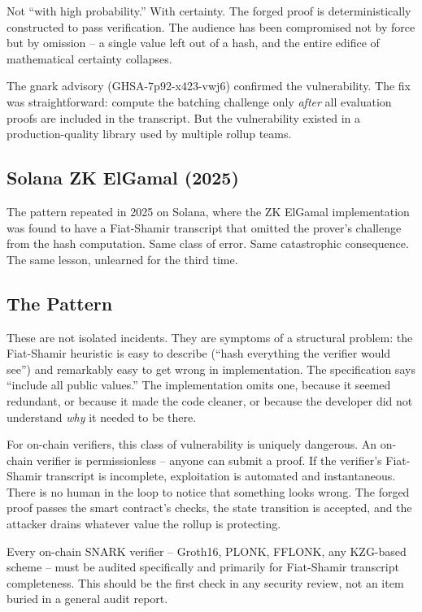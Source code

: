 \documentclass[
  11pt,
  openany]{report}
\begin{document}
Not ``with high probability.'' With certainty. The forged proof is
deterministically constructed to pass verification. The audience has been
compromised not by force but by omission -- a single value left out of a hash,
and the entire edifice of mathematical certainty collapses.

The gnark advisory (GHSA-7p92-x423-vwj6) confirmed the vulnerability. The fix
was straightforward: compute the batching challenge only \emph{after} all
evaluation proofs are included in the transcript. But the vulnerability existed
in a production-quality library used by multiple rollup teams.

\subsection{Solana ZK ElGamal (2025)}\label{solana-zk-elgamal-2025}

The pattern repeated in 2025 on Solana, where the ZK ElGamal implementation was
found to have a Fiat-Shamir transcript that omitted the prover's challenge from
the hash computation. Same class of error. Same catastrophic consequence. The
same lesson, unlearned for the third time.

\subsection{The Pattern}\label{the-pattern}

These are not isolated incidents. They are symptoms of a structural problem: the
Fiat-Shamir heuristic is easy to describe (``hash everything the verifier would
see'') and remarkably easy to get wrong in implementation. The specification
says ``include all public values.'' The implementation omits one, because it
seemed redundant, or because it made the code cleaner, or because the developer
did not understand \emph{why} it needed to be there.

For on-chain verifiers, this class of vulnerability is uniquely dangerous. An
on-chain verifier is permissionless -- anyone can submit a proof. If the
verifier's Fiat-Shamir transcript is incomplete, exploitation is automated and
instantaneous. There is no human in the loop to notice that something looks
wrong. The forged proof passes the smart contract's checks, the state transition
is accepted, and the attacker drains whatever value the rollup is protecting.

Every on-chain SNARK verifier -- Groth16, PLONK, FFLONK, any KZG-based scheme --
must be audited specifically and primarily for Fiat-Shamir transcript
completeness. This should be the first check in any security review, not an item
buried in a general audit report.
\end{document}
